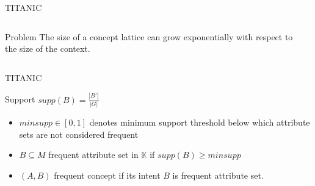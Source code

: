 \begin{frame}{TITANIC~\cite{titanic_2002}}
\begin{columns}
\begin{column}{0.7\textwidth}
\begin{alertblock}{Problem} %
The size of a concept lattice can grow exponentially with respect to the size of the context.
\end{alertblock}

\end{column}

\begin{column}{0.25\textwidth}






\end{column}
\end{columns}
\end{frame}


\begin{frame}{TITANIC~\cite{titanic_2002}}
\begin{definition}
Support $supp(B) = \frac{\left| B' \right|}{\left| G \right|}$
\end{definition}

\begin{itemize}
    \item<2-> $minsupp \in [0,1]$ denotes minimum support threshold below which attribute sets are not considered frequent
    \item<3-> $B \subseteq M$ frequent attribute set in $\mathbb{K}$ if $supp(B) \ge minsupp$
    \item<4-> $(A, B)$ frequent concept if its intent $B$ is frequent attribute set.
\end{itemize}


\end{frame}

